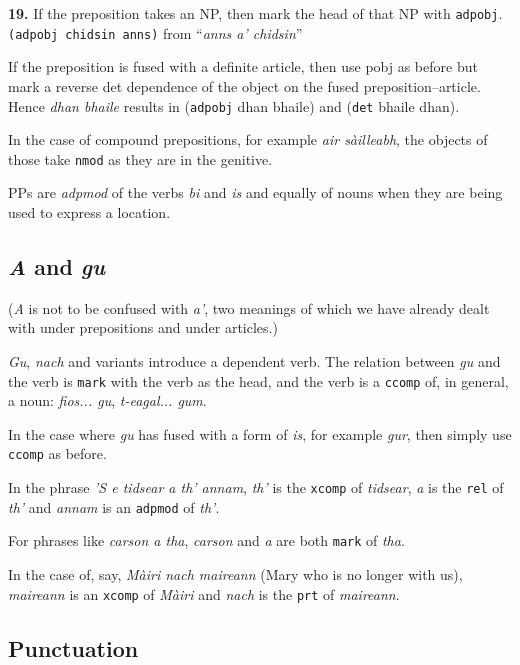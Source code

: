 \documentclass[a4paper]{article}
\begin{document}
{\bf 19.} If the preposition takes an NP, then mark the head of that NP with \texttt{adpobj}. \texttt{(adpobj chidsin anns)} from ``\textit{anns a' chidsin}''

 If the preposition is fused with a definite article, then use pobj as before but mark a reverse det dependence of the object on the fused preposition--article. Hence \textit{dhan bhaile} results in (\texttt{adpobj} dhan bhaile) and (\texttt{det} bhaile dhan).

 In the case of compound prepositions, for example \textit{air s\`ailleabh}, the objects of those take \texttt{nmod} as they are in the genitive.

 PPs are \textit{adpmod} of the verbs \textit{bi} and \textit{is} and equally of nouns when they are being used to express a location.

\subsection{\textit{A} and \textit{gu}}

(\textit{A} is not to be confused with \textit{a'}, two meanings of which we have already dealt with under prepositions and under articles.)

 \textit{Gu}, \textit{nach} and variants introduce a dependent verb. The relation between \textit{gu} and the verb is \texttt{mark} with the verb as the head, and the verb is a \texttt{ccomp} of, in general, a noun: \textit{fios... gu}, \textit{t-eagal... gum}.

 In the case where \textit{gu} has fused with a form of \textit{is}, for example \textit{gur}, then simply use \texttt{ccomp} as before.

 In the phrase \textit{'S e tidsear a th' annam}, \textit{th'} is the \texttt{xcomp} of \textit{tidsear}, \textit{a} is the \texttt{rel} of \textit{th'} and \textit{annam} is an \texttt{adpmod} of \textit{th'}.

 For phrases like \textit{carson a tha}, \textit{carson} and \textit{a} are both \texttt{mark} of \textit{tha}.

 In the case of, say, \textit{M\`airi nach maireann} (Mary who is no longer with us), \textit{maireann} is an \texttt{xcomp} of \textit{M\`airi} and \textit{nach} is the \texttt{prt} of \textit{maireann}.

\subsection{Punctuation}
\end{document}
